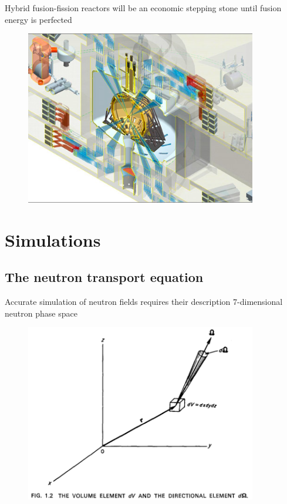 \documentclass{beamer}
\begin{document}
        \begin{frame}{Hybrid fusion-fission reactors will be an economic stepping stone until fusion energy is perfected}
            \begin{figure}
                \centering
                \includegraphics[width=0.9\textwidth]{./img/lifeChamber.png}
                \caption*{}
            \end{figure}
        \end{frame}

\section{Simulations}

    \subsection{The neutron transport equation}

        \begin{frame}{Accurate simulation of neutron fields requires their description 7-dimensional neutron phase space}
            \begin{figure}
                \centering
                \includegraphics[width=0.9\textwidth]{./img/phaseSpace.png}
            \end{figure}
        \end{frame}
\end{document}
